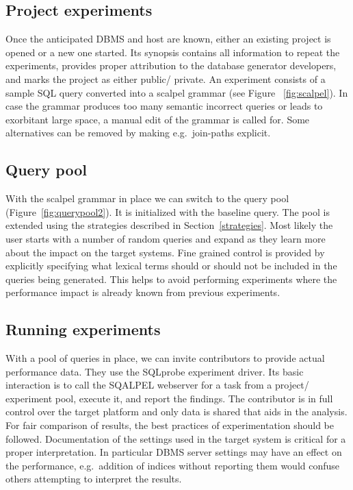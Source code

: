 \documentclass{cidr-2019}
\begin{document}
\subsection{Project experiments}
Once the anticipated DBMS and host are known, either an existing
project is opened or a new one started. Its synopsis contains all
information to repeat the experiments, provides proper attribution to
the database generator developers, and marks the project as either
public/ private. An experiment consists of a sample SQL query
converted into a scalpel grammar (see Figure ~\ref{fig:scalpel}). In
case the grammar produces too many semantic incorrect queries or leads
to exorbitant large space, a manual edit of the grammar is called
for. Some alternatives can be removed by making e.g.\ join-paths
explicit.

\subsection{Query pool}
With the scalpel grammar in place we can switch to the query pool
(Figure~\ref{fig:querypool2}). It is initialized with the baseline
query.
The pool is extended using the strategies described in
Section~\ref{strategies}. Most likely the user starts with a number of
random queries and expand as they learn more about the impact on the
target systems. Fine grained control is provided by explicitly
specifying what lexical terms should or should not be included in the
queries being generated. This helps to avoid performing experiments
where the performance impact is already known from previous
experiments.

\subsection{Running experiments}
With a pool of queries in place, we can invite contributors to provide
actual performance data. They use the {\sc SQLprobe} experiment
driver. Its basic interaction is to call the {\sc SQALPEL} webserver
for a task from a project/ experiment pool, execute it, and report the
findings. The contributor is in full control over the target platform
and only data is shared that aids in the analysis. For fair
comparison of results, the best practices of experimentation should be
followed.
Documentation of the settings used in the target system is critical
for a proper interpretation. In particular DBMS server settings may
have an effect on the performance, e.g.\ addition of indices without
reporting them would confuse others attempting to interpret the
results.
\end{document}
